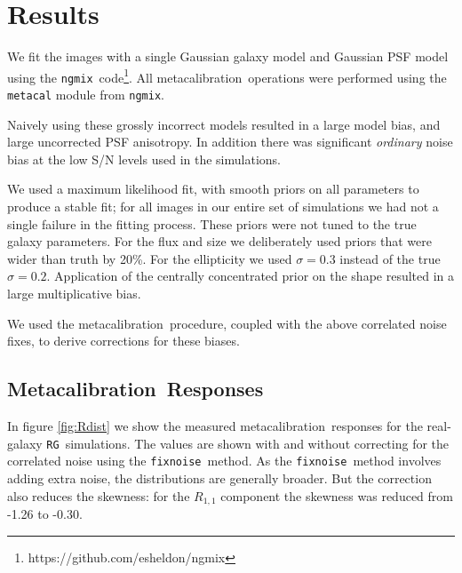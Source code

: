 \documentclass[usegraphicx,usenatbib]{mn2e}
\newcommand{\mcal}{metacalibration}
\newcommand{\Mcal}{Metacalibration}
\newcommand{\fixnoise}{\texttt{fixnoise}}
\newcommand{\ngmix}{\texttt{ngmix}}
\newcommand{\rgsim}{\texttt{RG}}
\begin{document}
\section{Results} \label{sec:detrendsim}

We fit the images with a single Gaussian galaxy model and Gaussian PSF model
using the \ngmix\ code\footnote{https://github.com/esheldon/ngmix}.  All \mcal\
operations were performed using the \texttt{metacal} module from \ngmix.

Naively using these grossly incorrect models resulted in a large model bias,
and large uncorrected PSF anisotropy.  In addition there was significant {\em
ordinary} noise bias at the low S/N levels used in the simulations.

We used a maximum likelihood fit, with smooth priors on all parameters to
produce a stable fit; for all images in our entire set of simulations we had not a
single failure in the fitting process.  These priors were not tuned to the true
galaxy parameters.  For the flux and size we deliberately used priors that were
wider than truth by 20\%.  For the ellipticity we used $\sigma=0.3$ instead of
the true $\sigma=0.2$.  Application of the centrally concentrated prior on the
shape resulted in a large multiplicative bias.

We used the \mcal\ procedure, coupled with the above correlated noise fixes, to
derive corrections for these biases.

\subsection{\Mcal\ Responses}

In figure \ref{fig:Rdist} we show the measured \mcal\ responses for
the real-galaxy \rgsim\ simulations.  The values are shown with
and without correcting for the correlated noise using the \fixnoise\
method.  As the \fixnoise\ method involves adding extra noise, the
distributions are generally broader.  But the correction also reduces
the skewness: for the $R_{1,1}$ component the skewness was reduced
from -1.26 to -0.30.
\end{document}
